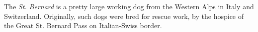 The \emph{St. Bernard} is a pretty large working dog from the Western Alps in Italy and Switzerland.
Originally, such dogs were bred for rescue work, by the hospice of the Great St. Bernard Pass on Italian-Swiss border.